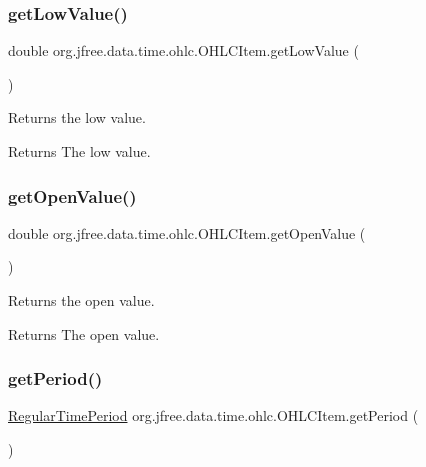 \subsubsection{\texorpdfstring{get\+Low\+Value()}{getLowValue()}}
{\footnotesize\ttfamily double org.\+jfree.\+data.\+time.\+ohlc.\+O\+H\+L\+C\+Item.\+get\+Low\+Value (\begin{DoxyParamCaption}{ }\end{DoxyParamCaption})}

Returns the low value.

\begin{DoxyReturn}{Returns}
The low value. 
\end{DoxyReturn}
\mbox{\label{classorg_1_1jfree_1_1data_1_1time_1_1ohlc_1_1_o_h_l_c_item_ad36fe1344143e4dab937f6eebf8d9d7b}} 
\subsubsection{\texorpdfstring{get\+Open\+Value()}{getOpenValue()}}
{\footnotesize\ttfamily double org.\+jfree.\+data.\+time.\+ohlc.\+O\+H\+L\+C\+Item.\+get\+Open\+Value (\begin{DoxyParamCaption}{ }\end{DoxyParamCaption})}

Returns the open value.

\begin{DoxyReturn}{Returns}
The open value. 
\end{DoxyReturn}
\mbox{\label{classorg_1_1jfree_1_1data_1_1time_1_1ohlc_1_1_o_h_l_c_item_a07d1bd43e4f369a9b9983797f77b60b9}} 
\subsubsection{\texorpdfstring{get\+Period()}{getPeriod()}}
{\footnotesize\ttfamily \mbox{\hyperlink{classorg_1_1jfree_1_1data_1_1time_1_1_regular_time_period}{Regular\+Time\+Period}} org.\+jfree.\+data.\+time.\+ohlc.\+O\+H\+L\+C\+Item.\+get\+Period (\begin{DoxyParamCaption}{ }\end{DoxyParamCaption})}

